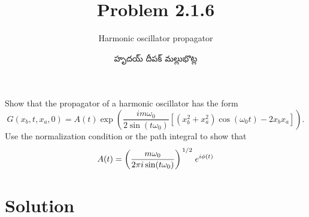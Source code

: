 \documentclass{article}
\title{Problem 2.1.6}
\subtitle{Harmonic oscillator propagator}
\author{\begin{telugu}హృదయ్ దీపక్ మల్లుభొట్ల\end{telugu}}
\date{}
\begin{document}
	\maketitle
	Show that the propagator of a harmonic oscillator has the form
	\begin{equation}
		G(x_b, t, x_a, 0) = A(t) \exp(\frac{i m \omega_0}{2 \sin(t \omega_0)} \left[ (x_b^2 + x_a^2)\cos(\omega_0 t) - 2 x_b x_a \right]).
	\end{equation}
	Use the normalization condition or the path integral to show that
	\begin{equation}
		A(t) = \left( \frac{m \omega_0}{2 \pi i\sin(t\omega_0)} \right)^{\flatfrac{1}{2}} e^{i \phi(t)}
	\end{equation}
	\section{Solution} \label{sec:solution}
\end{document}

